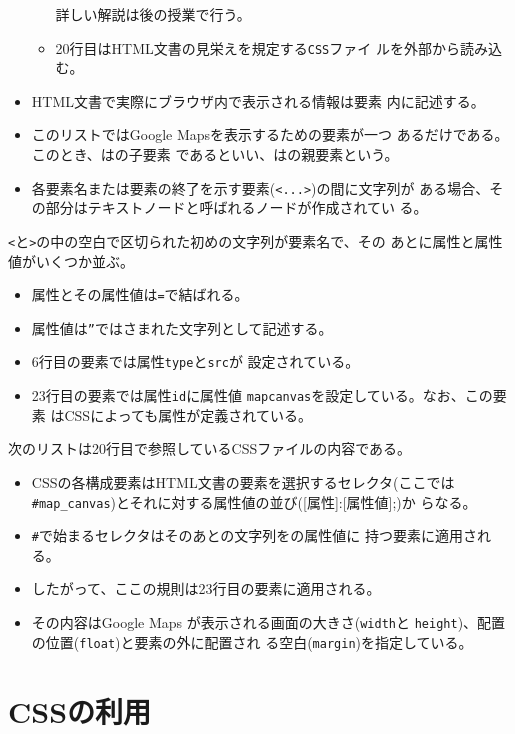 \begin{Exec}
\begin{itemize}
\begin{itemize}
		詳しい解説は後の授業で行う。
	  \item 20行目はHTML文書の見栄えを規定する\texttt{CSS}ファイ
		ルを外部から読み込む。
	 \end{itemize}
 \item HTML文書で実際にブラウザ内で表示される情報は要素
       内に記述する。
 \item このリストではGoogle Mapsを表示するための要素が一つ
       あるだけである。このとき、はの子要素
       であるといい、はの親要素という。
 \item 各要素名または要素の終了を示す要素(\texttt{<...>})の間に文字列が
       ある場合、その部分はテキストノードと呼ばれるノードが作成されてい
       る。
\end{itemize}
\texttt{<}と\texttt{>}の中の空白で区切られた初めの文字列が要素名で、その
 あとに属性と属性値がいくつか並ぶ。
\begin{itemize}
 \item 属性とその属性値は\texttt{=}で結ばれる。
 \item 属性値は\texttt{”}ではさまれた文字列として記述する。
 \item 6行目の要素では属性\texttt{type}と\texttt{src}が
       設定されている。
 \item 23行目の要素では属性\texttt{id}に属性値
       \texttt{map\textunderscore canvas}を設定している。なお、この要素
       はCSSによっても属性が定義されている。
\end{itemize}
次のリストは20行目で参照しているCSSファイルの内容である。
\begin{itemize}
 \item CSSの各構成要素はHTML文書の要素を選択するセレクタ(ここでは
       \Verb+#map_canvas+)とそれに対する属性値の並び([属性]:[属性値];)か
       らなる。
 \item \Verb+#+で始まるセレクタはそのあとの文字列をの属性値に
       持つ要素に適用される。
 \item したがって、ここの規則は23行目の要素に適用される。
 \item その内容はGoogle Maps が表示される画面の大きさ(\texttt{width}と
       \texttt{height})、配置の位置(\texttt{float})と要素の外に配置され
       る空白(\texttt{margin})を指定している。
\end{itemize}
\end{Exec}
\section{CSSの利用}


